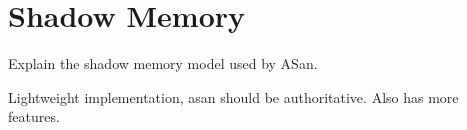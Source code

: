 \chapter {Shadow Memory}

Explain the shadow memory model used by ASan.

Lightweight implementation, asan should be authoritative. Also has more
features.


